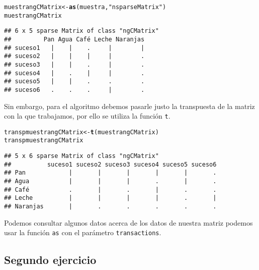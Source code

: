 \documentclass[12pt]{report}\usepackage[]{graphicx}\usepackage[dvipsnames]{xcolor}
\makeatletter
\newcommand{\hlstr}[1]{\textcolor[rgb]{0.192,0.494,0.8}{#1}}%
\newcommand{\hlstd}[1]{\textcolor[rgb]{0.345,0.345,0.345}{#1}}%
\newcommand{\hlkwb}[1]{\textcolor[rgb]{0.69,0.353,0.396}{#1}}%
\newcommand{\hlkwd}[1]{\textcolor[rgb]{0.737,0.353,0.396}{\textbf{#1}}}%
\newenvironment{kframe}{%
 \def\at@end@of@kframe{}%
 \ifinner\ifhmode%
  \def\at@end@of@kframe{\end{minipage}}%
  \begin{minipage}{\columnwidth}%
 \fi\fi%
 \def\FrameCommand##1{\hskip\@totalleftmargin \hskip-\fboxsep
 \colorbox{shadecolor}{##1}\hskip-\fboxsep
     \hskip-\linewidth \hskip-\@totalleftmargin \hskip\columnwidth}%
 \MakeFramed {\advance\hsize-\width
   \@totalleftmargin\z@ \linewidth\hsize
   \@setminipage}}%
 {\par\unskip\endMakeFramed%
 \at@end@of@kframe}
\newenvironment{knitrout}{}{} %
\makeatother
\begin{document}
\begin{knitrout}
\color{fgcolor}\begin{kframe}
\begin{alltt}
\hlstd{muestrangCMatrix} \hlkwb{<-} \hlkwd{as}\hlstd{(muestra,} \hlstr{"nsparseMatrix"}\hlstd{)}
\hlstd{muestrangCMatrix}
\end{alltt}
\begin{verbatim}
## 6 x 5 sparse Matrix of class "ngCMatrix"
##         Pan Agua Café Leche Naranjas
## suceso1   |    |    .     |        |
## suceso2   |    |    |     |        .
## suceso3   |    |    .     |        .
## suceso4   |    .    |     |        .
## suceso5   |    |    .     .        .
## suceso6   .    .    .     |        .
\end{verbatim}
\end{kframe}
\end{knitrout}
				
				Sin embargo, para el algoritmo debemos pasarle justo la transpuesta de la matriz con la que trabajamos, por ello se utiliza la función \texttt{t}. 
				
\begin{knitrout}
\color{fgcolor}\begin{kframe}
\begin{alltt}
\hlstd{transpmuestrangCMatrix} \hlkwb{<-} \hlkwd{t}\hlstd{(muestrangCMatrix)}
\hlstd{transpmuestrangCMatrix}
\end{alltt}
\begin{verbatim}
## 5 x 6 sparse Matrix of class "ngCMatrix"
##          suceso1 suceso2 suceso3 suceso4 suceso5 suceso6
## Pan            |       |       |       |       |       .
## Agua           |       |       |       .       |       .
## Café           .       |       .       |       .       .
## Leche          |       |       |       |       .       |
## Naranjas       |       .       .       .       .       .
\end{verbatim}
\end{kframe}
\end{knitrout}
				
				Podemos consultar algunos datos acerca de los datos de nuestra matriz podemos usar la función \texttt{as} con el parámetro \texttt{transactions}. 
			
			\subsection{Segundo ejercicio}
			
\end{document}
